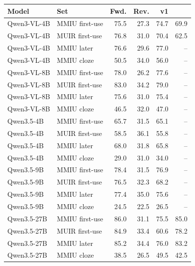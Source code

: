 \begin{tabular}{llrrrr}
\toprule
Model & Set & Fwd. & Rev. & \rthree{} v1 & \rthree{} \\
\midrule
Qwen3-VL-4B & MMIU first-use & 75.5 & 27.3 & 74.7 & 69.9 \\
Qwen3-VL-4B & MUIR first-use & 76.8 & 31.0 & 70.4 & 62.5 \\
Qwen3-VL-4B & MMIU later & 76.6 & 29.6 & 77.0 & -- \\
Qwen3-VL-4B & MMIU cloze & 50.5 & 34.0 & 56.0 & -- \\
\midrule
Qwen3-VL-8B & MMIU first-use & 78.0 & 26.2 & 77.6 & -- \\
Qwen3-VL-8B & MUIR first-use & 83.0 & 34.2 & 79.0 & -- \\
Qwen3-VL-8B & MMIU later & 75.6 & 31.0 & 75.4 & -- \\
Qwen3-VL-8B & MMIU cloze & 46.5 & 32.0 & 47.0 & -- \\
\midrule
Qwen3.5-4B & MMIU first-use & 65.7 & 31.5 & 65.1 & -- \\
Qwen3.5-4B & MUIR first-use & 58.5 & 36.1 & 55.8 & -- \\
Qwen3.5-4B & MMIU later & 68.0 & 31.8 & 65.8 & -- \\
Qwen3.5-4B & MMIU cloze & 29.0 & 31.0 & 34.0 & -- \\
\midrule
Qwen3.5-9B & MMIU first-use & 78.4 & 31.5 & 76.9 & -- \\
Qwen3.5-9B & MUIR first-use & 76.5 & 32.3 & 68.2 & -- \\
Qwen3.5-9B & MMIU later & 77.4 & 35.0 & 75.6 & -- \\
Qwen3.5-9B & MMIU cloze & 24.5 & 22.5 & 26.5 & -- \\
\midrule
Qwen3.5-27B & MMIU first-use & 86.0 & 31.1 & 75.5 & 85.0 \\
Qwen3.5-27B & MUIR first-use & 84.9 & 33.4 & 60.6 & 78.2 \\
Qwen3.5-27B & MMIU later & 85.2 & 34.4 & 76.0 & 83.2 \\
Qwen3.5-27B & MMIU cloze & 38.5 & 26.5 & 49.5 & 42.5 \\
\bottomrule
\end{tabular}
